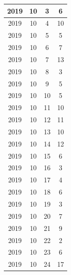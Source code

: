 \begin{longtable} {|c|c|c|c|}
\hline
2019         & 10           & 3            & 6                         \\ 
\hline
2019         & 10           & 4            & 10                        \\ 
\hline
2019         & 10           & 5            & 5                         \\ 
\hline
2019         & 10           & 6            & 7                         \\ 
\hline
2019         & 10           & 7            & 13                        \\ 
\hline
2019         & 10           & 8            & 3                         \\ 
\hline
2019         & 10           & 9            & 5                         \\ 
\hline
2019         & 10           & 10           & 5                         \\ 
\hline
2019         & 10           & 11           & 10                        \\ 
\hline
2019         & 10           & 12           & 11                        \\ 
\hline
2019         & 10           & 13           & 10                        \\ 
\hline
2019         & 10           & 14           & 12                        \\ 
\hline
2019         & 10           & 15           & 6                         \\ 
\hline
2019         & 10           & 16           & 3                         \\ 
\hline
2019         & 10           & 17           & 4                         \\ 
\hline
2019         & 10           & 18           & 6                         \\ 
\hline
2019         & 10           & 19           & 3                         \\ 
\hline
2019         & 10           & 20           & 7                         \\ 
\hline
2019         & 10           & 21           & 9                         \\ 
\hline
2019         & 10           & 22           & 2                         \\ 
\hline
2019         & 10           & 23           & 6                         \\ 
\hline
2019         & 10           & 24           & 17                        \\ 

\end{longtable}
